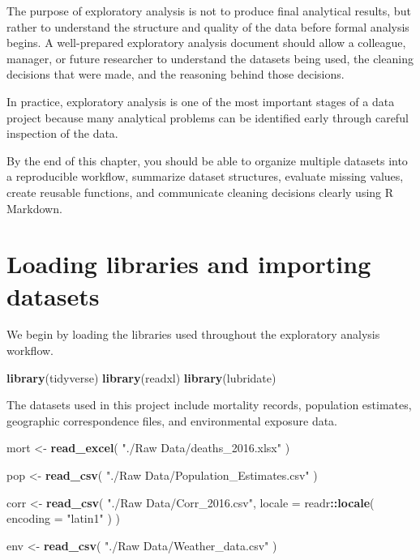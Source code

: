 \documentclass[
  11pt,
  oneside]{book}
\newenvironment{Shaded}{\begin{snugshade}}{\end{snugshade}}
\newcommand{\AttributeTok}[1]{\textcolor[rgb]{0.13,0.29,0.53}{#1}}
\newcommand{\FunctionTok}[1]{\textcolor[rgb]{0.13,0.29,0.53}{\textbf{#1}}}
\newcommand{\NormalTok}[1]{#1}
\newcommand{\OtherTok}[1]{\textcolor[rgb]{0.56,0.35,0.01}{#1}}
\newcommand{\SpecialCharTok}[1]{\textcolor[rgb]{0.81,0.36,0.00}{\textbf{#1}}}
\newcommand{\StringTok}[1]{\textcolor[rgb]{0.31,0.60,0.02}{#1}}
\begin{document}
The purpose of exploratory analysis is not to produce final analytical results, but rather to understand the structure and quality of the data before formal analysis begins. A well-prepared exploratory analysis document should allow a colleague, manager, or future researcher to understand the datasets being used, the cleaning decisions that were made, and the reasoning behind those decisions.

In practice, exploratory analysis is one of the most important stages of a data project because many analytical problems can be identified early through careful inspection of the data.

By the end of this chapter, you should be able to organize multiple datasets into a reproducible workflow, summarize dataset structures, evaluate missing values, create reusable functions, and communicate cleaning decisions clearly using R Markdown.

\section{Loading libraries and importing datasets}\label{loading-libraries-and-importing-datasets}

We begin by loading the libraries used throughout the exploratory analysis workflow.

\begin{Shaded}
\begin{Highlighting}[]
\FunctionTok{library}\NormalTok{(tidyverse)}
\FunctionTok{library}\NormalTok{(readxl)}
\FunctionTok{library}\NormalTok{(lubridate)}
\end{Highlighting}
\end{Shaded}

The datasets used in this project include mortality records, population estimates, geographic correspondence files, and environmental exposure data.

\begin{Shaded}
\begin{Highlighting}[]
\NormalTok{mort }\OtherTok{\textless{}{-}} \FunctionTok{read\_excel}\NormalTok{(}
  \StringTok{"./Raw Data/deaths\_2016.xlsx"}
\NormalTok{)}

\NormalTok{pop }\OtherTok{\textless{}{-}} \FunctionTok{read\_csv}\NormalTok{(}
  \StringTok{"./Raw Data/Population\_Estimates.csv"}
\NormalTok{)}

\NormalTok{corr }\OtherTok{\textless{}{-}} \FunctionTok{read\_csv}\NormalTok{(}
  \StringTok{"./Raw Data/Corr\_2016.csv"}\NormalTok{,}
  \AttributeTok{locale =}\NormalTok{ readr}\SpecialCharTok{::}\FunctionTok{locale}\NormalTok{(}
    \AttributeTok{encoding =} \StringTok{"latin1"}
\NormalTok{  )}
\NormalTok{)}

\NormalTok{env }\OtherTok{\textless{}{-}} \FunctionTok{read\_csv}\NormalTok{(}
  \StringTok{"./Raw Data/Weather\_data.csv"}
\NormalTok{)}
\end{Highlighting}
\end{Shaded}
\end{document}

